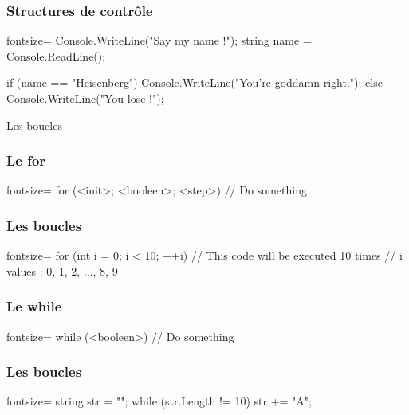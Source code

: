 \begin{frame}[fragile]
  \frametitle{Structures de contrôle}

  \begin{csharpcode*}{fontsize=\scriptsize}
    Console.WriteLine("Say my name !");
    string name = Console.ReadLine();

    if (name == "Heisenberg")
    {
      Console.WriteLine("You're goddamn right.");
    }
    else
    {
      Console.WriteLine("You lose !");
    }
  \end{csharpcode*}
\end{frame}

\begin{frame}
  \begin{center}
    \vspace{1cm}
    Les boucles
  \end{center}
\end{frame}

\begin{frame}[fragile]
  \frametitle{Le for}

  \begin{csharpcode*}{fontsize=\scriptsize}
    for (<init>; <booleen>; <step>)
    {
      // Do something
    }
  \end{csharpcode*}
\end{frame}

\begin{frame}[fragile]
  \frametitle{Les boucles}

  \begin{csharpcode*}{fontsize=\scriptsize}
    for (int i = 0; i < 10; ++i)
    {
      // This code will be executed 10 times
      // i values : 0, 1, 2, ..., 8, 9
    }
  \end{csharpcode*}
\end{frame}

\begin{frame}[fragile]
  \frametitle{Le while}

  \begin{csharpcode*}{fontsize=\scriptsize}
    while (<booleen>)
    {
      // Do something
    }
  \end{csharpcode*}
\end{frame}

\begin{frame}[fragile]
  \frametitle{Les boucles}

  \begin{csharpcode*}{fontsize=\scriptsize}
    string str = "";
    while (str.Length != 10)
    {
      str += "A";
    }
  \end{csharpcode*}
\end{frame}

